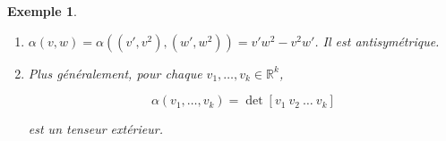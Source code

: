 \documentclass[french]{article}
\newtheorem{exemple}{Exemple}
\begin{document}
\begin{exemple}
  \begin{enumerate}
    \item \(\alpha(v,w) = \alpha((v',v ^2), (w', w ^2)) = v'w ^2 - v ^2 w'\). Il est antisymétrique.
    \item Plus généralement, pour chaque \(v_1, \dots, v_k \in \mathbb{R}^k\),

    \[\alpha(v_1, \dots, v_k)  = \operatorname{det}[v_1 \ v_2 \ \dots \ v_k]\]

    est un tenseur extérieur.
  \end{enumerate}
\end{exemple}
\end{document}
